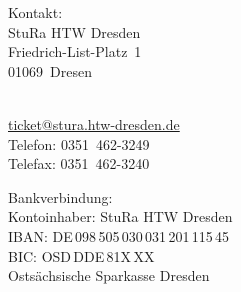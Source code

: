 \documentclass[%
	ngerman,	%
	parskip=half,
	paper=a4,%
	pagesize=auto	%
	]{scrartcl}
\begin{document}
\noindent
\parbox{.3\linewidth}{
Kontakt:\\
StuRa HTW Dresden\\
Friedrich-List-Platz~1\\
01069~Dresen\\
\hspace{0em}
}
\hfill
\parbox{.3\linewidth}{
\hspace{0em}\\
\href{mailto:ticket@stura.htw-dresden.de}{ticket@stura.htw-dresden.de}\\
Telefon: 0351~462-3249\\
Telefax: 0351~462-3240\\
\hspace{0em}
}
\hfill
\parbox{.3\linewidth}{
Bankverbindung:\\
Kontoinhaber: StuRa HTW Dresden\\
IBAN: DE\,098\,505\,030\,031\,201\,115\,45\\
BIC: OSD\,DDE\,81X\,XX\\
Ostsächsische Sparkasse Dresden
}
\end{document}
